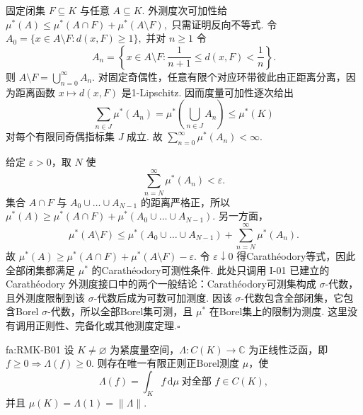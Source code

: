 \begin{FAProof}
固定闭集 \(\displaystyle F\subseteq K\) 与任意 \(\displaystyle A\subseteq K\). 外测度次可加性给
\(\displaystyle \mu^*(A)\leqslant\mu^*(A\cap F)+\mu^*(A\setminus F),\)
只需证明反向不等式. 令
\(\displaystyle A_0=\{x\in A\setminus F:d(x,F)\geqslant1\},\)
并对 \(\displaystyle n\geqslant1\) 令
\[
A_n=\left\{x\in A\setminus F:\frac1{n+1}\leqslant d(x,F)<\frac1n\right\}.
\]
则 \(\displaystyle A\setminus F=\bigcup_{n=0}^{\infty}A_n\). 对固定奇偶性，任意有限个对应环带彼此由正距离分离，因为距离函数 \(\displaystyle x\mapsto d(x,F)\) 是1-Lipschitz. 因而度量可加性逐次给出
\[
\sum_{n\in J}\mu^*(A_n)
=\mu^*\left(\bigcup_{n\in J}A_n\right)
\leqslant\mu^*(K)
\]
对每个有限同奇偶指标集 \(\displaystyle J\) 成立. 故 \(\displaystyle\sum_{n=0}^{\infty}\mu^*(A_n)<\infty\).

给定 \(\displaystyle\varepsilon>0\)，取 \(\displaystyle N\) 使
\[
\sum_{n=N}^{\infty}\mu^*(A_n)<\varepsilon.
\]
集合 \(\displaystyle A\cap F\) 与 \(\displaystyle A_0\cup\dots\cup A_{N-1}\) 的距离严格正，所以
\(\displaystyle \mu^*(A) \geqslant \mu^*(A\cap F) + \mu^*(A_0\cup\dots\cup A_{N-1}).\)
另一方面，
\[
\mu^*(A\setminus F)
\leqslant
\mu^*(A_0\cup\dots\cup A_{N-1})
+
\sum_{n=N}^{\infty}\mu^*(A_n).
\]
故
\(\displaystyle \mu^*(A) \geqslant \mu^*(A\cap F)+\mu^*(A\setminus F)-\varepsilon.\)
令 \(\displaystyle\varepsilon\downarrow0\) 得Carath\'eodory等式，因此全部闭集都满足 \(\displaystyle\mu^*\) 的Carath\'eodory可测性条件. 此处只调用 I-01 已建立的 Carath\'eodory 外测度接口中的两个一般结论：Carath\'eodory可测集构成 \(\displaystyle\sigma\)-代数，且外测度限制到该 \(\displaystyle\sigma\)-代数后成为可数可加测度. 因该 \(\displaystyle\sigma\)-代数包含全部闭集，它包含Borel \(\displaystyle\sigma\)-代数，所以全部Borel集可测，且 \(\displaystyle\mu^*\) 在Borel集上的限制为测度. 这里没有调用正则性、完备化或其他测度定理.\hfill\(\square\)
\end{FAProof}

\begin{FATheorem}{fa:RMK-B01}
设 \(\displaystyle K\neq\varnothing\) 为紧度量空间，\(\displaystyle\Lambda:C(K)\to\mathbb C\) 为正线性泛函，即
\(\displaystyle f\geqslant0\Longrightarrow\Lambda(f)\geqslant0.\)
则存在唯一有限正则正Borel测度 \(\displaystyle\mu\)，使
\[
\Lambda(f)=\int_K f\,\mathrm{d}\mu
\;\text{对全部 }f\in C(K),
\]
并且
\(\displaystyle \mu(K)=\Lambda(1)=\|\Lambda\|.\)
\end{FATheorem}

